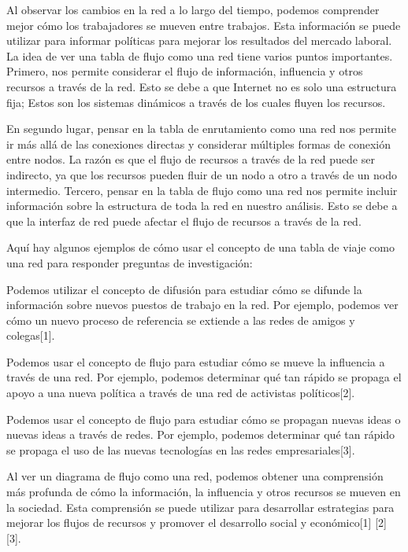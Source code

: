 \documentclass{article}
\begin{document}
Al observar los cambios en la red a lo largo del tiempo, podemos comprender mejor cómo los trabajadores se mueven entre trabajos. Esta información se puede utilizar para informar políticas para mejorar los resultados del mercado laboral. La idea de ver una tabla de flujo como una red tiene varios puntos importantes. Primero, nos permite considerar el flujo de información, influencia y otros recursos a través de la red. Esto se debe a que Internet no es solo una estructura fija; Estos son los sistemas dinámicos a través de los cuales fluyen los recursos.

En segundo lugar, pensar en la tabla de enrutamiento como una red nos permite ir más allá de las conexiones directas y considerar múltiples formas de conexión entre nodos. La razón es que el flujo de recursos a través de la red puede ser indirecto, ya que los recursos pueden fluir de un nodo a otro a través de un nodo intermedio. Tercero, pensar en la tabla de flujo como una red nos permite incluir información sobre la estructura de toda la red en nuestro análisis. Esto se debe a que la interfaz de red puede afectar el flujo de recursos a través de la red.

Aquí hay algunos ejemplos de cómo usar el concepto de una tabla de viaje como una red para responder preguntas de investigación:

Podemos utilizar el concepto de difusión para estudiar cómo se difunde la información sobre nuevos puestos de trabajo en la red. Por ejemplo, podemos ver cómo un nuevo proceso de referencia se extiende a las redes de amigos y colegas[1].

Podemos usar el concepto de flujo para estudiar cómo se mueve la influencia a través de una red. Por ejemplo, podemos determinar qué tan rápido se propaga el apoyo a una nueva política a través de una red de activistas políticos[2].

Podemos usar el concepto de flujo para estudiar cómo se propagan nuevas ideas o nuevas ideas a través de redes. Por ejemplo, podemos determinar qué tan rápido se propaga el uso de las nuevas tecnologías en las redes empresariales[3].

Al ver un diagrama de flujo como una red, podemos obtener una comprensión más profunda de cómo la información, la influencia y otros recursos se mueven en la sociedad. Esta comprensión se puede utilizar para desarrollar estrategias para mejorar los flujos de recursos y promover el desarrollo social y económico[1] [2] [3]. 
\end{document}
